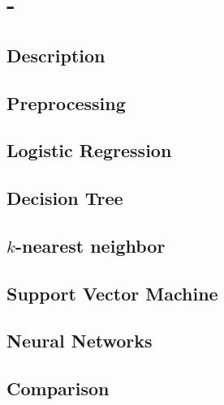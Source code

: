 \section{-}
\label{db:sec:ds3}
\subsection{Description}

\subsection{Preprocessing}

\subsection{Logistic Regression}

\subsection{Decision Tree}

\subsection{$k$-nearest neighbor}

\subsection{Support Vector Machine}

\subsection{Neural Networks}

\subsection{Comparison}
